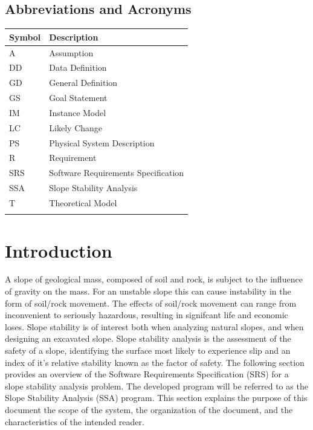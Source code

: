 \documentclass[12pt]{article}
\begin{document}
\subsection{Abbreviations and Acronyms}
\label{Sec:AbbrandAcro}
\begin{longtable*}{l l}
\toprule
Symbol & Description
\\
\midrule
A & Assumption
\\
DD & Data Definition
\\
GD & General Definition
\\
GS & Goal Statement
\\
IM & Instance Model
\\
LC & Likely Change
\\
PS & Physical System Description
\\
R & Requirement
\\
SRS & Software Requirements Specification
\\
SSA & Slope Stability Analysis
\\
T & Theoretical Model
\\
\bottomrule
\label{Table:AbbrandAcro}
\end{longtable*}
\section{Introduction}
\label{Sec:Intr}
A slope of geological mass, composed of soil and rock, is subject to the influence of gravity on the mass. For an unstable slope this can cause instability in the form of soil/rock movement. The effects of soil/rock movement can range from inconvenient to seriously hazardous, resulting in signifcant life and economic loses. Slope stability is of interest both when analyzing natural slopes, and when designing an excavated slope. Slope stability analysis is the assessment of the safety of a slope, identifying the surface most likely to experience slip and an index of it's relative stability known as the factor of safety.
The following section provides an overview of the Software Requirements Specification (SRS) for a slope stability analysis problem. The developed program will be referred to as the Slope Stability Analysis (SSA) program. This section explains the purpose of this document the scope of the system, the organization of the document, and the characteristics of the intended reader.
\end{document}
